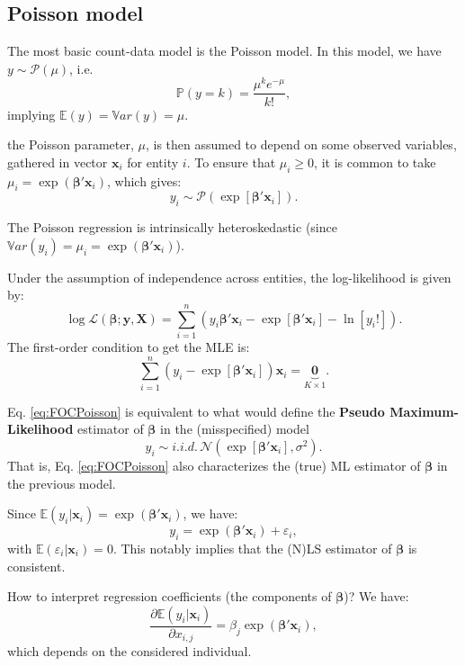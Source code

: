 \documentclass[
  12pt,
]{book}
\theoremstyle{definition}
\theoremstyle{definition}
\theoremstyle{definition}
\theoremstyle{definition}
\theoremstyle{remark}
\begin{document}
\hypertarget{poisson-model}{%
\subsection{Poisson model}\label{poisson-model}}

The most basic count-data model is the Poisson model. In this model, we have \(y \sim \mathcal{P}(\mu)\), i.e.
\[
\mathbb{P}(y=k) = \frac{\mu^k e^{-\mu}}{k!},
\]
implying \(\mathbb{E}(y) = \mathbb{V}ar(y) = \mu\).

the Poisson parameter, \(\mu\), is then assumed to depend on some observed variables, gathered in vector \(\mathbf{x}_i\) for entity \(i\). To ensure that \(\mu_i \ge 0\), it is common to take \(\mu_i = \exp(\boldsymbol\beta'\mathbf{x}_i)\), which gives:
\[
y_i \sim \mathcal{P}(\exp[\boldsymbol\beta'\mathbf{x}_i]).
\]

The Poisson regression is intrinsically heteroskedastic (since \(\mathbb{V}ar(y_i) = \mu_i = \exp(\boldsymbol\beta'\mathbf{x}_i)\)).

Under the assumption of independence across entities, the log-likelihood is given by:
\[
\log \mathcal{L}(\boldsymbol\beta;\mathbf{y},\mathbf{X}) = \sum_{i=1}^n (y_i \boldsymbol\beta'\mathbf{x}_i - \exp[\boldsymbol\beta'\mathbf{x}_i] - \ln[y_i!]).
\]
The first-order condition to get the MLE is:
\begin{equation}
\sum_{i=1}^n (y_i - \exp[\boldsymbol\beta'\mathbf{x}_i])\mathbf{x}_i = \underbrace{\mathbf{0}}_{K \times 1}. \label{eq:FOCPoisson}
\end{equation}

Eq. \eqref{eq:FOCPoisson} is equivalent to what would define the \textbf{Pseudo Maximum-Likelihood} estimator of \(\boldsymbol\beta\) in the (misspecified) model
\[
y_i \sim i.i.d.\,\mathcal{N}(\exp[\boldsymbol\beta'\mathbf{x}_i],\sigma^2).
\]
That is, Eq. \eqref{eq:FOCPoisson} also characterizes the (true) ML estimator of \(\boldsymbol\beta\) in the previous model.

Since \(\mathbb{E}(y_i|\mathbf{x}_i) = \exp(\boldsymbol\beta'\mathbf{x}_i)\), we have:
\[
y_i = \exp(\boldsymbol\beta'\mathbf{x}_i) + \varepsilon_i,
\]
with \(\mathbb{E}(\varepsilon_i|\mathbf{x}_i) = 0\). This notably implies that the (N)LS estimator of \(\boldsymbol\beta\) is consistent.

How to interpret regression coefficients (the components of \(\boldsymbol\beta\))? We have:
\[
\frac{\partial \mathbb{E}(y_i|\mathbf{x}_i)}{\partial x_{i,j}} = \beta_j \exp(\boldsymbol\beta'\mathbf{x}_i),
\]
which depends on the considered individual.
\end{document}
